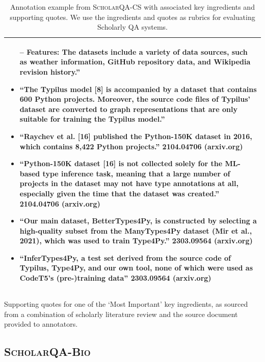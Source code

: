 \begin{table}[t!]
\begin{subtable}{\textwidth}
\begin{tabular}{p{14cm}}
\begin{itemize}
        -- \textbf{Features}: The datasets include a variety of data sources, such as weather information, GitHub repository data, and Wikipedia revision history.''
         \item ``The Typilus model [8] is accompanied by a dataset that contains 600 Python projects. Moreover, the source code files of Typilus’ dataset are converted to graph representations that are only suitable for training the Typilus model.''
         \item ``Raychev et al. [16] published the Python-150K dataset in 2016, which contains 8,422 Python projects.'' 2104.04706 (arxiv.org)
          \item ``Python-150K dataset [16] is not collected solely for the ML-based type inference task, meaning that a large number of projects in the dataset may not have type annotations at all, especially given the time that the dataset was created.'' 2104.04706 (arxiv.org)
         \item ``Our main dataset, BetterTypes4Py, is constructed by selecting a high-quality subset from the ManyTypes4Py dataset (Mir et al., 2021), which was used to train Type4Py.'' 2303.09564 (arxiv.org)
         \item ``InferTypes4Py, a test set derived from the source code of Typilus, Type4Py, and our own tool, none of which were used as CodeT5’s (pre-)training data'' 2303.09564 (arxiv.org)
   \end{itemize}
   \\\bottomrule 
   \end{tabular}
   
   \caption{Supporting quotes for one of the `Most Important' key ingredients, as sourced from a combination of scholarly literature review and the source document provided to annotators.}
   \end{subtable}
   \caption{Annotation example from \textsc{ScholarQA-CS} with associated key ingredients and supporting quotes. We use the ingredients and quotes as rubrics for evaluating Scholarly QA systems.}
   \label{tab:examplse_cs_queries}
\end{table}
\subsection{\textsc{ScholarQA-Bio}}
\label{app_sec:examples_biomed_queries}

